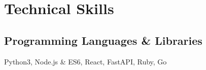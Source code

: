 \documentclass[]{deedy-resume-openfont}
\begin{document}
\begin{minipage}[t]{0.33\textwidth}



    \section{Technical Skills}
    \subsection{Programming Languages \& Libraries}
    Python3, Node.js \& ES6, React, FastAPI, Ruby, Go \\
    \vspace{\topsep} %
    

\end{minipage}
\end{document}

